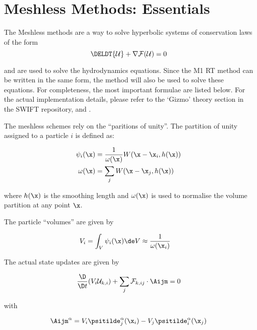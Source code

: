 \section{Meshless Methods: Essentials}

The Meshless methods are a way to solve hyperbolic systems of conservation laws of the form
\begin{equation}
    \DELDT{\mathcal{U}} + \nabla \mathcal{F}(\mathcal{U}) = 0 \label{eq:conservation-law}
\end{equation}

and are used to solve the hydrodynamics equations.
Since the M1 RT method can be written in the same form, the method will also be 
used to solve these equations. For completeness, the most important formulae are 
listed below. For the actual implementation details, please refer to the `Gizmo'
theory section in the SWIFT repository, and \cite{hopkinsGIZMONewClass2015}.



The meshless schemes rely on the ``paritions of unity''. 
The partition of unity assigned to a particle $i$ is defined as:

\begin{align}
	\psi_i(\x) &= \frac{1}{\omega(\x)} W(\x - \x_i, h(\x))		\label{eq:psi} \\
	\omega(\x) &= \sum_j W(\x - \x_j, h(\x)) 					\label{eq:omega}
\end{align}

where $h(\x)$ is the smoothing length and $\omega(\x)$ is used to normalise the 
volume partition at any point $\x$. 

The particle ``volumes'' are given by

\begin{align}
	V_i &= \int_V \psi_i(\x) \de V \approx \frac{1}{\omega(\x_i)} \label{psi_volume_integral}
\end{align}


The actual state updates are given by

\begin{equation}
	\frac{\D}{\D t} (V_i \mathcal{U}_{k,i}) + \sum_j \mathcal{F}_{k,ij} \cdot \Aijm = 0
\end{equation}


with

\begin{equation}
	\Aijm^\alpha = V_i \psitilde_j^\alpha (\x_i) - V_j\psitilde_i^\alpha (\x_j) 			\label{eq:HopkinsAij}
\end{equation}

